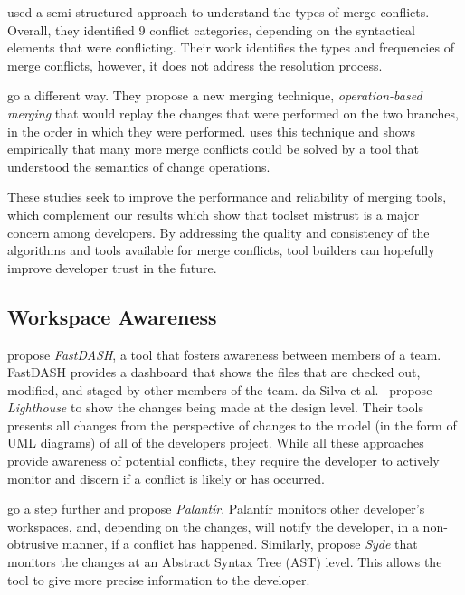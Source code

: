 \citet{accioly_understanding_2018} used a semi-structured approach to understand the types of merge conflicts.
Overall, they identified 9 conflict categories, depending on the syntactical elements that were conflicting.
Their work identifies the types and frequencies of merge conflicts, however, it does not address the resolution process.

\citet{lippe_operation-based_1992} go a different way.
They propose a new merging technique, \emph{operation-based merging} that would replay the changes that were performed on the two branches, in the order in which they were performed.
\citet{dig_effective_2008} uses this technique and shows empirically that many more merge conflicts could be solved by a tool that understood the semantics of change operations.

These studies seek to improve the performance and reliability of merging tools, which complement our results which show that toolset mistrust is a major concern among developers.
By addressing the quality and consistency of the algorithms and tools available for merge conflicts, tool builders can hopefully improve developer trust in the future.

\subsection{Workspace Awareness} 

\citet{biehl_fastdash:_2007} propose \emph{FastDASH}, a tool that fosters awareness between members of a team. 
FastDASH provides a dashboard that shows the files that are checked out, modified, and staged by other members of the team.
da Silva et al.~\cite{da_silva_lighthouse:_2006} propose \emph{Lighthouse} to show the changes being made at the design level.
Their tools presents all changes from the perspective of changes to the model (in the form of UML diagrams) of all of the developers project.
While all these approaches provide awareness of potential conflicts, they require the developer to actively monitor and discern if a conflict is likely or has occurred.

\citet{palantir, sarma_palantir:_2003} go a step further and propose \emph{Palant\'{i}r}.
Palant\'{i}r monitors other developer's workspaces, and, depending on the changes, will notify the developer, in a non-obtrusive manner, if a conflict has happened.
Similarly, \citet{hattori2010syde} propose \emph{Syde} that monitors the changes at an Abstract Syntax Tree (AST) level.
This allows the tool to give more precise information to the developer.

